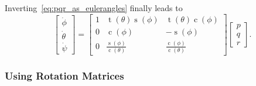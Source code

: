 \documentclass[12pt,a4paper,fleqn]{article}
\newcommand{\ssin}[0]{\operatorname{s}}
\newcommand{\scos}[0]{\operatorname{c}}
\newcommand{\stan}[0]{\operatorname{t}}
\begin{document}
%
Inverting~\eqref{eq:pqr_as_eulerangles} finally leads to 
%
\begin{equation}
\begin{bmatrix}
	\dot{\phi} \\ \dot{\theta} \\ \dot{\psi} 
\end{bmatrix} 
 =
\begin{bmatrix} 1 & \stan(\theta)\ssin(\phi) & \stan(\theta)\scos(\phi) \\ 0 & \scos(\phi) & -\ssin(\phi) \\ 0 & \frac{\ssin(\phi)}{\scos(\theta)}  & \frac{\scos(\phi)}{\scos(\theta)} \end{bmatrix}
\begin{bmatrix}
	p \\ q \\ r 
\end{bmatrix} .     
\end{equation}

\subsubsection{Using Rotation Matrices}\label{sec:dynamicsrotmat}
\end{document}

